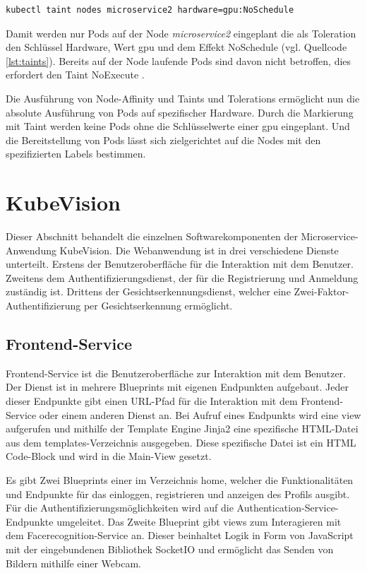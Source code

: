 \begin{lstlisting}[caption={Node-Taints},captionpos=b,label={lst:taints},language=bash]
kubectl taint nodes microservice2 hardware=gpu:NoSchedule
\end{lstlisting}

Damit werden nur Pods auf der Node \textit{microservice2} eingeplant die als Toleration den Schlüssel Hardware, Wert gpu und dem Effekt NoSchedule (vgl. Quellcode \ref{lst:taints}).
Bereits auf der Node laufende Pods sind davon nicht betroffen, dies erfordert den Taint NoExecute \cite{taintstolerations}.

Die Ausführung von Node-Affinity und Taints und Tolerations ermöglicht nun die absolute Ausführung von Pods auf spezifischer Hardware.
Durch die Markierung mit Taint werden keine Pods ohne die Schlüsselwerte einer \acs{gpu} eingeplant.
Und die Bereitstellung von Pods lässt sich zielgerichtet auf die Nodes mit den spezifizierten Labels bestimmen.

\section{KubeVision}
Dieser Abschnitt behandelt die einzelnen Softwarekomponenten der Microservice-Anwendung KubeVision.
Die Webanwendung ist in drei verschiedene Dienste unterteilt.
Erstens der Benutzeroberfläche für die Interaktion mit dem Benutzer.
Zweitens dem Authentifizierungsdienst, der für die Registrierung und Anmeldung zuständig ist.
Drittens der Gesichtserkennungsdienst, welcher eine Zwei-Faktor-Authentifizierung per Gesichtserkennung ermöglicht.

\subsection{Frontend-Service}
Frontend-Service ist die Benutzeroberfläche zur Interaktion mit dem Benutzer.
Der Dienst ist in mehrere Blueprints mit eigenen Endpunkten aufgebaut.
Jeder dieser Endpunkte gibt einen URL-Pfad für die Interaktion mit dem Frontend-Service oder einem anderen Dienst an.
Bei Aufruf eines Endpunkts wird eine view aufgerufen und mithilfe der Template Engine Jinja2 eine spezifische HTML-Datei aus dem templates-Verzeichnis ausgegeben.
Diese spezifische Datei ist ein HTML Code-Block und wird in die Main-View gesetzt.

Es gibt Zwei Blueprints einer im Verzeichnis home, welcher die Funktionalitäten und Endpunkte für das einloggen, registrieren und anzeigen des Profils ausgibt.
Für die Authentifizierungsmöglichkeiten wird auf die Authentication-Service-Endpunkte umgeleitet.
Das Zweite Blueprint gibt views zum Interagieren mit dem Facerecognition-Service an.
Dieser beinhaltet Logik in Form von JavaScript mit der eingebundenen Bibliothek SocketIO und ermöglicht das Senden von Bildern mithilfe einer Webcam.

